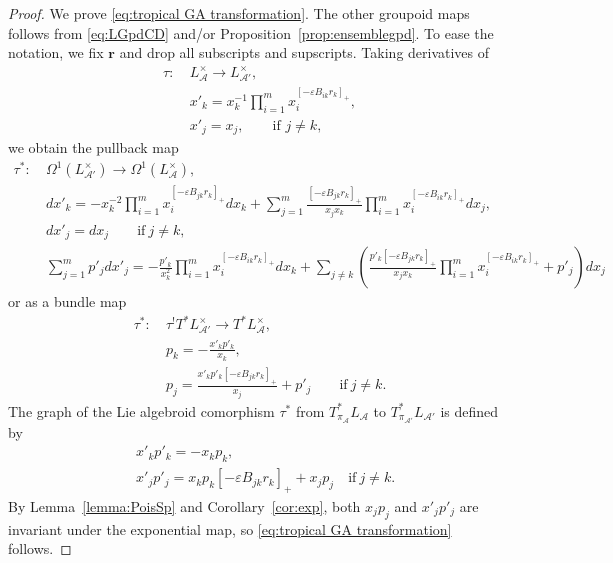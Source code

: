 \documentclass{amsart}
\numberwithin{equation}{section}
\newcommand{\bfr}{{\boldsymbol{r}}}
\newcommand{\cA}{\mathcal{A}}
\begin{document}
\begin{proof}
  We prove \eqref{eq:tropical GA transformation}.
  The other groupoid maps follows from \eqref{eq:LGpdCD} and/or Proposition~\ref{prop:ensemblegpd}.
  To ease the notation, we fix $\bfr$ and drop all subscripts and supscripts.
  Taking derivatives of
  \begin{align*}
    \tau:~ & L^\times_{\cA}\to L^\times_{\cA'}, \\
      & x'_k =x_k^{-1}\prod\limits_{i=1}^m x_i^{[-\varepsilon B_{ik}r_k]_+}, \\
      & x'_j = x_j, \qquad \text{if } j \ne k,
  \end{align*}
  we obtain the pullback map
  \begin{align*}
    \tau^*:~ & \Omega^1(L^\times_{\cA'}) \to \Omega^1(L^\times_{\cA}), \\
      & dx'_k = - x_k^{-2}\prod\limits_{i=1}^m x_i^{[- \varepsilon B_{jk} r_k]_+} dx_k + \sum\limits_{j=1}^m \frac{[- \varepsilon B_{jk} r_k]_+}{x_j x_k} \prod\limits_{i=1}^m x_i^{[- \varepsilon B_{ik} r_k]_+} dx_j, \\
      & dx'_j = dx_j \qquad \text{if}~j\ne k, \\
      & \sum\limits_{j=1}^m p'_j dx'_j = - \frac{p'_k}{x_k^2}\prod\limits_{i=1}^m x_i^{[- \varepsilon B_{ik} r_k]_+} dx_k + \sum\limits_{j\ne k} \left(\frac{p'_k [- \varepsilon B_{jk} r_k]_+ }{x_jx_k} \prod\limits_{i=1}^m x_i^{[- \varepsilon B_{ik} r_k]_+}  + p'_j\right)dx_j
  \end{align*}
  or as a bundle map
  \begin{align*}
    \tau^*:~ & \tau^! T^* L^\times_{\cA'} \to T^* L^\times_{\cA},  \\
      & p_k = - \frac{x'_k p'_k}{x_k}, \\
      & p_j = \frac{x'_kp'_k [- \varepsilon B_{jk} r_k]_+ }{x_j}   + p'_j \qquad \text{if}~j\ne k.
  \end{align*}
  The graph of the Lie algebroid comorphism $\tau^*$ from $T^*_{\pi_{\cA}} L_{\cA}$ to $T^*_{\pi_{\cA'}} L_{\cA'}$ is defined by
  \begin{align*}
    & x'_k p'_k = - x_k p_k , \\
    & x'_j p'_j = x_kp_k [- \varepsilon B_{jk} r_k]_+  + x_jp_j \quad \text{if}~j\ne k.
  \end{align*}
  By Lemma~\ref{lemma:PoisSp} and Corollary~\ref{cor:exp}, both $x_j p_j$ and $x'_j p'_j$ are invariant under the exponential map, so \eqref{eq:tropical GA transformation} follows.
\end{proof}
\end{document}
